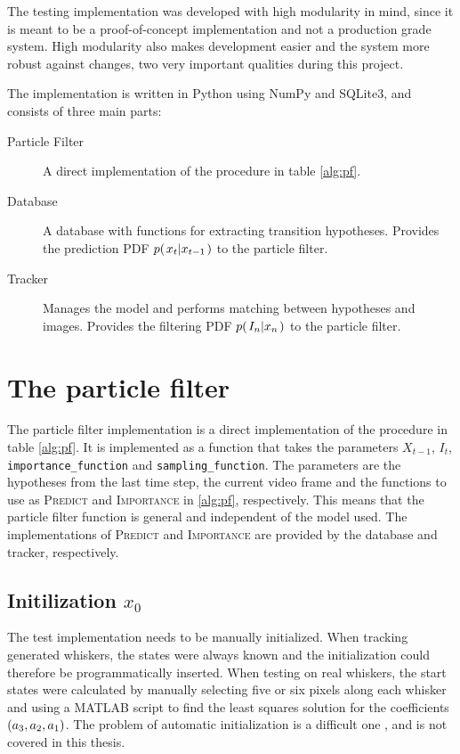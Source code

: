 The testing implementation was developed with high modularity in mind,
since it is meant to be a proof-of-concept implementation and not a
production grade system. High modularity also makes development easier
and the system more robust against changes, two very important
qualities during this project.

The implementation is written in Python using NumPy and SQLite3, and
consists of three main parts:
\begin{description}
  \item[Particle Filter] A direct  implementation of the procedure in
    table \ref{alg:pf}.
  \item[Database] A database with functions for extracting transition
    hypotheses. Provides the prediction PDF $p{(\left. x_t \middle\vert x_{t-1} \right.)}$ to the
    particle filter.
  \item[Tracker] Manages the model and performs matching between
    hypotheses and images. Provides the filtering PDF
    $p{(\left. I_n \middle\vert x_n \right.)}$ to the particle filter.
\end{description}

\section{The particle filter}
The particle filter implementation is a direct implementation of the
procedure in table \ref{alg:pf}. It is implemented as a function that
takes the parameters $X_{t-1}$, $I_t$, \texttt{importance\_function} and
\texttt{sampling\_function}. The parameters are the hypotheses from
the last time step, the current video frame and the functions to use
as \textsc{Predict} and \textsc{Importance} in \ref{alg:pf},
respectively. This means that the particle filter function is general
and independent of the model used. The implementations of
\textsc{Predict} and \textsc{Importance} are provided by the database
and tracker, respectively.

\subsection{Initilization $x_0$}
The test implementation needs to be manually initialized. When
tracking generated whiskers, the states were always known and the
initialization could therefore be programmatically inserted. When
testing on real whiskers, the start states were calculated by manually
selecting five or six pixels along each whisker and using a MATLAB
script to find the least squares solution for the coefficients
$\left( a_3, a_2, a_1 \right)$. The problem of automatic
initialization is a difficult one \cite{Hedvig}, and is not covered in
this thesis.

